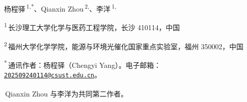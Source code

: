{\normalsize 杨程驿\,\textsuperscript{1,*}、Qianxin Zhou\,\textsuperscript{2,\textdagger}、李洋\,\textsuperscript{1,\textdagger}\par}
\vspace{0.4em}
{\small \textsuperscript{1}\,长沙理工大学化学与医药工程学院，长沙 410114，中国\par
\textsuperscript{2}\,福州大学化学学院，能源与环境光催化国家重点实验室，福州 350002，中国\par}
\vspace{0.3em}
{\footnotesize \textsuperscript{*}\,通讯作者：杨程驿（Chengyi Yang）。电子邮箱：\href{mailto:202509240114@csust.edu.cn}{\nolinkurl{202509240114@csust.edu.cn}}。\par}
{\footnotesize \textsuperscript{\textdagger}\,Qianxin Zhou 与李洋为共同第二作者。\par}
